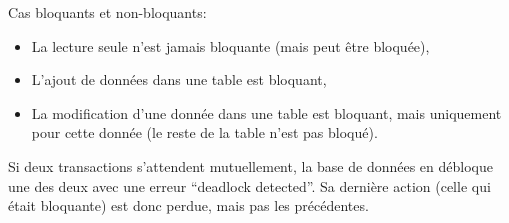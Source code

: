\documentclass[10pt,a4paper,french]{article}
\begin{document}
Cas bloquants et non-bloquants:
\begin{itemize}
\item La lecture seule n'est jamais bloquante (mais peut être bloquée),
\item L'ajout de données dans une table est bloquant, \hfill {}
\item La modification d'une donnée dans une table est bloquant, mais uniquement pour cette donnée (le reste de la table n'est pas bloqué). \hfill {}
\end{itemize}
Si deux transactions s'attendent mutuellement, la base de données en débloque une des deux avec une erreur ``deadlock detected''. Sa dernière action (celle qui était bloquante) est donc perdue, mais pas les précédentes.

\appendix %

\printglossaries
\end{document}
